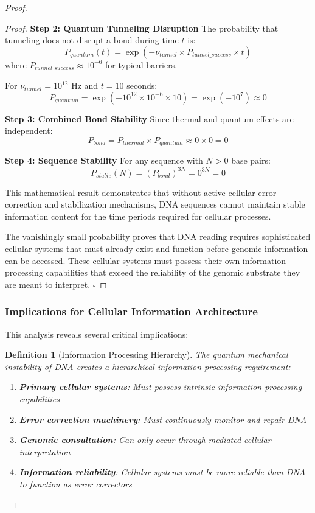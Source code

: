 \documentclass[12pt,a4paper]{article}
\newtheorem{definition}[theorem]{Definition}
\begin{document}
\begin{proof}
\begin{proof}
\textbf{Step 2: Quantum Tunneling Disruption}
The probability that tunneling does not disrupt a bond during time $t$ is:
\begin{equation}
P_{quantum}(t) = \exp(-\nu_{tunnel} \times P_{tunnel\_success} \times t)
\end{equation}
where $P_{tunnel\_success} \approx 10^{-6}$ for typical barriers.

For $\nu_{tunnel} = 10^{12}$ Hz and $t = 10$ seconds:
\begin{equation}
P_{quantum} = \exp(-10^{12} \times 10^{-6} \times 10) = \exp(-10^7) \approx 0
\end{equation}

\textbf{Step 3: Combined Bond Stability}
Since thermal and quantum effects are independent:
\begin{equation}
P_{bond} = P_{thermal} \times P_{quantum} \approx 0 \times 0 = 0
\end{equation}

\textbf{Step 4: Sequence Stability}
For any sequence with $N > 0$ base pairs:
\begin{equation}
P_{stable}(N) = (P_{bond})^{3N} = 0^{3N} = 0
\end{equation}

This mathematical result demonstrates that without active cellular error correction and stabilization mechanisms, DNA sequences cannot maintain stable information content for the time periods required for cellular processes.

The vanishingly small probability proves that DNA reading requires sophisticated cellular systems that must already exist and function before genomic information can be accessed. These cellular systems must possess their own information processing capabilities that exceed the reliability of the genomic substrate they are meant to interpret. $\square$
\end{proof}

\subsubsection{Implications for Cellular Information Architecture}

This analysis reveals several critical implications:

\begin{definition}[Information Processing Hierarchy]
The quantum mechanical instability of DNA creates a hierarchical information processing requirement:
\begin{enumerate}
\item \textbf{Primary cellular systems}: Must possess intrinsic information processing capabilities
\item \textbf{Error correction machinery}: Must continuously monitor and repair DNA
\item \textbf{Genomic consultation}: Can only occur through mediated cellular interpretation
\item \textbf{Information reliability}: Cellular systems must be more reliable than DNA to function as error correctors
\end{enumerate}
\end{definition}


\end{proof}
\end{document}

